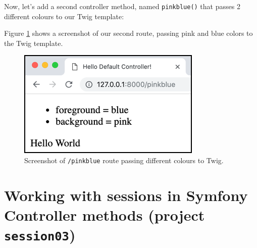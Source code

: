 \documentclass[a4paperpaper,openright]{book}
\newenvironment{Shaded}{}{}
\newcommand{\AnnotationTok}[1]{\textcolor[rgb]{0.38,0.63,0.69}{\textbf{\textit{#1}}}}
\newcommand{\CommentTok}[1]{\textcolor[rgb]{0.38,0.63,0.69}{\textit{#1}}}
\newcommand{\KeywordTok}[1]{\textcolor[rgb]{0.00,0.44,0.13}{\textbf{#1}}}
\newcommand{\NormalTok}[1]{#1}
\newcommand{\OtherTok}[1]{\textcolor[rgb]{0.00,0.44,0.13}{#1}}
\newcommand{\StringTok}[1]{\textcolor[rgb]{0.25,0.44,0.63}{#1}}
\begin{document}
Now, let's add a second controller method, named \texttt{pinkblue()}
that passes 2 different colours to our Twig template:

\begin{Shaded}
\end{Shaded}

Figure \ref{twig_colours} shows a screenshot of our second route,
passing pink and blue colors to the Twig template.

\begin{figure}
\centering
\includegraphics{./tex2pdf.-d01fd108a306454d/208cfa06fb9ee48e693def7d3b21bfe0a1bed489.png}
\caption{Screenshot of \texttt{/pinkblue} route passing different
colours to Twig. \label{twig_colours}}
\end{figure}

\hypertarget{working-with-sessions-in-symfony-controller-methods-project-session03}{%
\section{\texorpdfstring{Working with sessions in Symfony Controller
methods (project
\texttt{session03})}{Working with sessions in Symfony Controller methods (project session03)}}\label{working-with-sessions-in-symfony-controller-methods-project-session03}}
\end{document}
